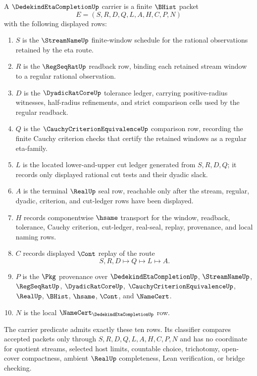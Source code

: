 \begin{definition}
\label{def:dedekind-eta-completion-carrier}
A $\DedekindEtaCompletionUp$ carrier is a finite $\BHist$ packet
$$
E=(S,R,D,Q,L,A,H,C,P,N)
$$
with the following displayed rows:
\begin{enumerate}
\item $S$ is the $\StreamNameUp$ finite-window schedule for the rational observations retained by the eta route.
\item $R$ is the $\RegSeqRatUp$ readback row, binding each retained stream window to a regular rational observation.
\item $D$ is the $\DyadicRatCoreUp$ tolerance ledger, carrying positive-radius witnesses, half-radius refinements, and strict comparison cells used by the regular readback.
\item $Q$ is the $\CauchyCriterionEquivalenceUp$ comparison row, recording the finite Cauchy criterion checks that certify the retained windows as a regular eta-family.
\item $L$ is the located lower-and-upper cut ledger generated from $S,R,D,Q$; it records only displayed rational cut tests and their dyadic slack.
\item $A$ is the terminal $\RealUp$ seal row, reachable only after the stream, regular, dyadic, criterion, and cut-ledger rows have been displayed.
\item $H$ records componentwise $\hsame$ transport for the window, readback, tolerance, Cauchy criterion, cut-ledger, real-seal, replay, provenance, and local naming rows.
\item $C$ records displayed $\Cont$ replay of the route
$$
S,R,D \longmapsto Q \longmapsto L \longmapsto A .
$$
\item $P$ is the $\Pkg$ provenance over $\DedekindEtaCompletionUp$, $\StreamNameUp$, $\RegSeqRatUp$, $\DyadicRatCoreUp$, $\CauchyCriterionEquivalenceUp$, $\RealUp$, $\BHist$, $\hsame$, $\Cont$, and $\NameCert$.
\item $N$ is the local $\NameCert_{\DedekindEtaCompletionUp}$ row.
\end{enumerate}
The carrier predicate admits exactly these ten rows. Its classifier compares accepted packets only through $S,R,D,Q,L,A,H,C,P,N$ and has no coordinate for quotient streams, selected host limits, countable choice, trichotomy, open-cover compactness, ambient $\RealUp$ completeness, Lean verification, or bridge checking.
\end{definition}

